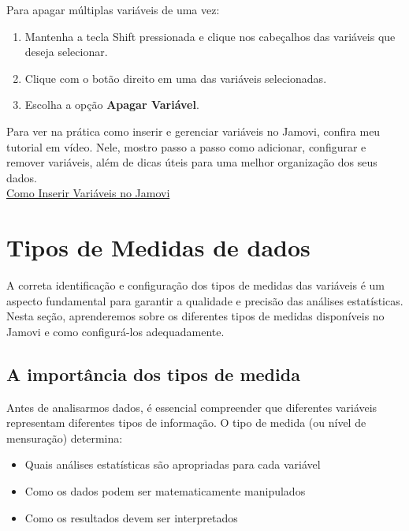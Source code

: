 Para apagar múltiplas variáveis de uma vez:
\begin{enumerate}
    \item Mantenha a tecla Shift pressionada e clique nos cabeçalhos das variáveis que deseja selecionar.
    \item Clique com o botão direito em uma das variáveis selecionadas.
    \item Escolha a opção \textbf{Apagar Variável}.
\end{enumerate}

\begin{tcolorbox}[colback=white,colframe=red,title={\faPlayCircle \ Dica de Conteúdo}]
  Para ver na prática como inserir e gerenciar variáveis no Jamovi, confira meu tutorial em vídeo. Nele, mostro passo a passo como adicionar, configurar e remover variáveis, além de dicas úteis para uma melhor organização dos seus dados.\\
  \textcolor{red}{\faYoutube} \href{https://youtu.be/UqEnetiHEns?si=qvTd5AucIA88QR3j}{Como Inserir Variáveis no Jamovi}
\end{tcolorbox}


\section{Tipos de Medidas de dados}

A correta identificação e configuração dos tipos de medidas das variáveis é um aspecto fundamental para garantir a qualidade e precisão das análises estatísticas. Nesta seção, aprenderemos sobre os diferentes tipos de medidas disponíveis no Jamovi e como configurá-los adequadamente.

\subsection{A importância dos tipos de medida}

Antes de analisarmos dados, é essencial compreender que diferentes variáveis representam diferentes tipos de informação. O tipo de medida (ou nível de mensuração) determina:

\begin{itemize}
    \item Quais análises estatísticas são apropriadas para cada variável
    \item Como os dados podem ser matematicamente manipulados
    \item Como os resultados devem ser interpretados
\end{itemize}


